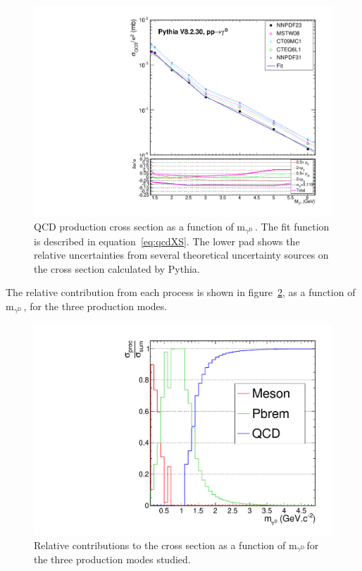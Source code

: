 \documentclass[12pt,a4paper,]{article}
\newcommand{\mathDP}{\gamma^{\mathrm{D}}\ }
\newcommand{\mDP}{m$_{\mathDP}$}
\begin{document}
\begin{figure}[h!]
  \centering
\includegraphics[width=1.\textwidth]{figures/qcdXSnorm_massFit_WithSysts.pdf}
\caption{QCD production cross section as a function of \mDP. The fit
  function is described in equation~\ref{eq:qcdXS}. The lower pad
  shows the relative uncertainties from several theoretical
  uncertainty sources on the cross section calculated by Pythia.}
\label{fig:qcdXS}
\end{figure}

The relative contribution from each process is shown in
figure~\ref{fig:allXS}, as a function of \mDP, for the three
production modes.

\begin{figure}[h!]
  \centering
\includegraphics[width=1.\textwidth]{figures/XSvsMass.pdf}
\caption{Relative contributions to the cross section as a function of \mDP for the three production modes studied.}
\label{fig:allXS}
\end{figure}
\end{document}
